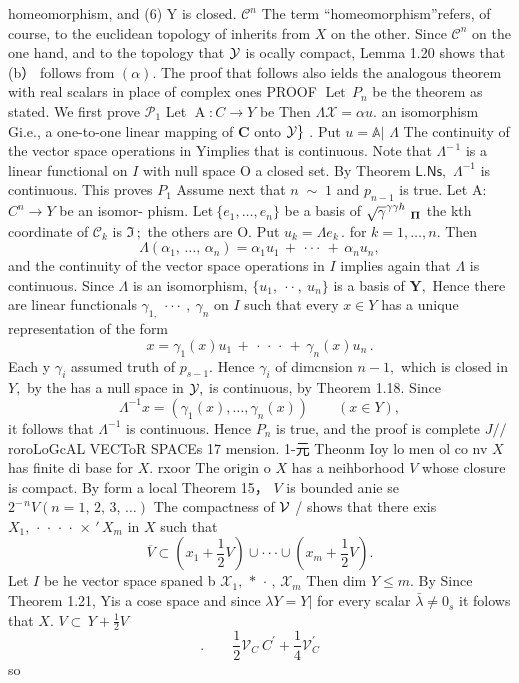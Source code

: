 homeomorphism, and (6) Y is closed. ${\mathcal{C}}^{n}$ The term “homeomorphism”refers, of course, to the euclidean topology of inherits from $\textstyle{X}$ on the other. Since ${\mathcal{C}}^{n}$ on the one hand, and to the topology that ${\cal{Y}}$ is ocally compact, Lemma 1.20 shows that (b） follows from $(\alpha).$ The proof that follows also ields the analogous theorem with real scalars in place of complex ones PROOF $\operatorname{Let}\,P_{n}$ be the theorem as stated. We first prove $\mathbf{\mathcal{P}}_{1}$ Let $\operatorname{A}\!:C\to Y$ be Then $\Lambda\mathcal{X}=\mathcal{\alpha}u.$ an isomorphism Gi.e., a one-to-one linear mapping of ${\boldsymbol{C}}$ onto ${\cal{Y}}\}$ . Put $u=\mathbb{A}|$ $\Lambda$ The continuity of the vector space operations in Yimplies that is continuous. Note that $\Lambda^{-\,1}$ is a linear functional on $\boldsymbol{\mathit{I}}$ with null space {O} a closed set. By Theorem $\mathsf{L.N s},$ $\Lambda^{-1}$ is continuous. This proves $P_{1}$ Assume next that $\scriptstyle n\;{\sim}\;1$ and $p_{n-1}$ is true. Let A: $C^{n}\to Y$ be an isomor- phism. ${\mathrm{Let~}}\{e_{1},\ldots,e_{n}\}$ be a basis of $\sqrt{\gamma}^{\gamma\gamma h}\ _{\bf\Pi}$ the kth coordinate of ${\mathcal{C}}_{k}$ is ${\mathfrak{I}}\,;$ the others are O. Put $u_{k}=\Lambda e_{k}\,.$ for $k=1,\dotsc,n.$ Then $$ \Lambda(\alpha_{1},\,\ldots,\,\alpha_{n})=\alpha_{1}u_{1}\,+\,\cdot\cdot\cdot\,+\,\alpha_{n}u_{n}, $$ and the continuity of the vector space operations in $\boldsymbol{\mathit{I}}$ implies again that $\Lambda$ is continuous. Since $\Lambda$ is an isomorphism, $\{u_{1},\ \cdot\cdot\ ,\ u_{n}\}$ is a basis of ${\boldsymbol{Y}},$ Hence there are linear functionals $\gamma_{1,}\ \cdot\cdot\cdot\ ,\ \gamma_{n}$ on $\boldsymbol{\mathit{I}}$ such that every $x\in Y$ has a unique representation of the form $$ x=\gamma_{1}(x)u_{1}\,+\,\cdot\,\cdot\,\cdot\,+\,\gamma_{n}(x)u_{n}\,. $$ Each y $\gamma_{i}$ assumed truth of $p_{s-1}.$ Hence $\gamma_{i}$ of dimcnsion $n-1,$ which is closed in $\textstyle Y,$ by the has a null space in ${\cal Y},$ is continuous, by Theorem 1.18. Since $$ \Lambda^{-1}x=(\gamma_{1}(x),\ldots,\gamma_{n}(x))\qquad(x\in Y), $$ it follows that $\Lambda^{-1}$ is continuous. Hence $\textstyle P_{n}$ is true, and the proof is complete $J/\slash$roroLoGcAL VECToR SPACEs 17 mension. 1-元 Theonm Ioy lo men ol co nv $X$ has finite di base for $X.$ rxoor The origin o $\textstyle{X}$ has a neihborhood ${\mathbf{}}V$ whose closure is compact. By form a local Theorem 15， ${\mathbf{}}V$ is bounded anie se $2^{-\,n}V\left(n=1,\,2,\,3,\,\ldots\right)$ The compactness of ${\cal{V}}$ / shows that there exis $X_{1},\,\cdot\,\cdot\,\cdot\,\cdot\,\times\,\prime\,X_{m}$ in $\textstyle{X}$ such that $$ {\overline{{V}}}\subset(x_{1}+{\textstyle{\frac{1}{2}}}V)\cup\cdot\cdot\cdot\cup(x_{m}+{\textstyle{\frac{1}{2}}}V). $$ Let $\boldsymbol{\mathit{I}}$ be he vector space spaned b ${\mathcal{X}}_{1},\,\ast\,\cdot\,,\,{\mathcal{X}}_{m}$ Then dim $Y\leq m.$ By Since Theorem 1.21, Yis a cose space and since $\lambda Y=Y|$ for every scalar ${\bar{\lambda}}\neq0_{s}$ it folows that $X.$ $V\subset\,Y+{\frac{1}{2}}V$ $$ .\qquad{\frac{1}{2}}{\mathcal{V}}_{C}\ C^{\prime}+{\frac{1}{4}}{\mathcal{V}}_{C}^{\prime} $$ so 